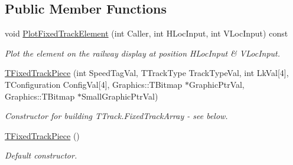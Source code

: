 \subsection*{Public Member Functions}
\begin{DoxyCompactItemize}
\item 
\mbox{\label{class_t_fixed_track_piece_a13eca615770d45f35bb808eaa264fda9}} 
void \mbox{\hyperlink{class_t_fixed_track_piece_a13eca615770d45f35bb808eaa264fda9}{Plot\+Fixed\+Track\+Element}} (int Caller, int H\+Loc\+Input, int V\+Loc\+Input) const
\begin{DoxyCompactList}\small\item\em Plot the element on the railway display at position H\+Loc\+Input \& V\+Loc\+Input. \end{DoxyCompactList}\item 
\mbox{\label{class_t_fixed_track_piece_af9d54643faf473becbc953a11eacab51}} 
\mbox{\hyperlink{class_t_fixed_track_piece_af9d54643faf473becbc953a11eacab51}{T\+Fixed\+Track\+Piece}} (int Speed\+Tag\+Val, T\+Track\+Type Track\+Type\+Val, int Lk\+Val\mbox{[}4\mbox{]}, T\+Configuration Config\+Val\mbox{[}4\mbox{]}, Graphics\+::\+T\+Bitmap $\ast$Graphic\+Ptr\+Val, Graphics\+::\+T\+Bitmap $\ast$Small\+Graphic\+Ptr\+Val)
\begin{DoxyCompactList}\small\item\em Constructor for building T\+Track.\+Fixed\+Track\+Array -\/ see below. \end{DoxyCompactList}\item 
\mbox{\label{class_t_fixed_track_piece_a5b7733fb7da20c74bd811743d70cd535}} 
\mbox{\hyperlink{class_t_fixed_track_piece_a5b7733fb7da20c74bd811743d70cd535}{T\+Fixed\+Track\+Piece}} ()
\begin{DoxyCompactList}\small\item\em Default constructor. \end{DoxyCompactList}\end{DoxyCompactItemize}
